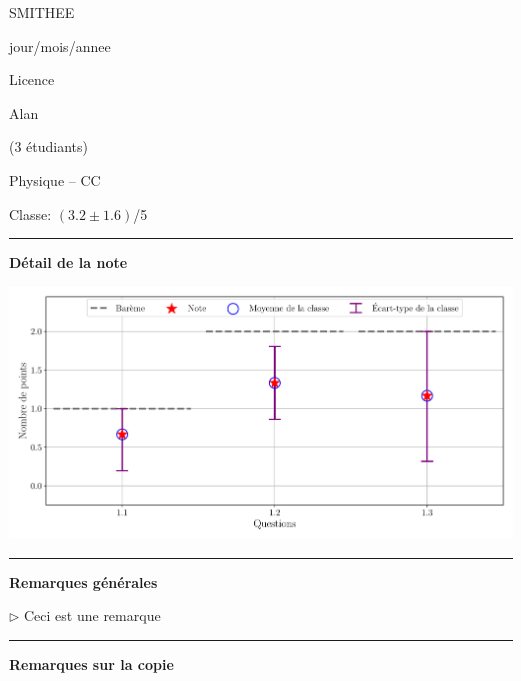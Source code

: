 \documentclass[12pt, a4paper]{article}
\begin{document}
\pagestyle{empty}
\noindent\begin{minipage}[c]{0.31\linewidth}\noindent SMITHEE\end{minipage}\hfill
\begin{minipage}[c]{0.31\linewidth}\centering jour/mois/annee \end{minipage}\hfill
\begin{minipage}[c]{0.31\linewidth}\hfill Licence \end{minipage}\hfill

\noindent\begin{minipage}[c]{0.31\linewidth}\noindent Alan\end{minipage}\hfill
\begin{minipage}[c]{0.31\linewidth}\hfill(3 étudiants)\end{minipage}
\begin{center} Physique -- CC\bigskip

{\Large\bf {}}\end{center}

\vspace*{-0.7cm}\hfill Classe:  $\left(3.2 \pm 1.6\right)$/5
\noindent\rule{\linewidth}{.7pt}\begin{center}{\large\bf Détail de la note}\end{center}

\begin{center}
\includegraphics[keepaspectratio, width=\linewidth]{./output/SMITHEE_Alan_GradeStats.pdf}\end{center}


\noindent\rule{\linewidth}{.7pt}\begin{center}{\large\bf Remarques générales}\end{center}

$\triangleright$\xspace Ceci est une remarque


\noindent\rule{\linewidth}{.7pt}\begin{center}{\large\bf Remarques sur la copie}\end{center}
\end{document}
